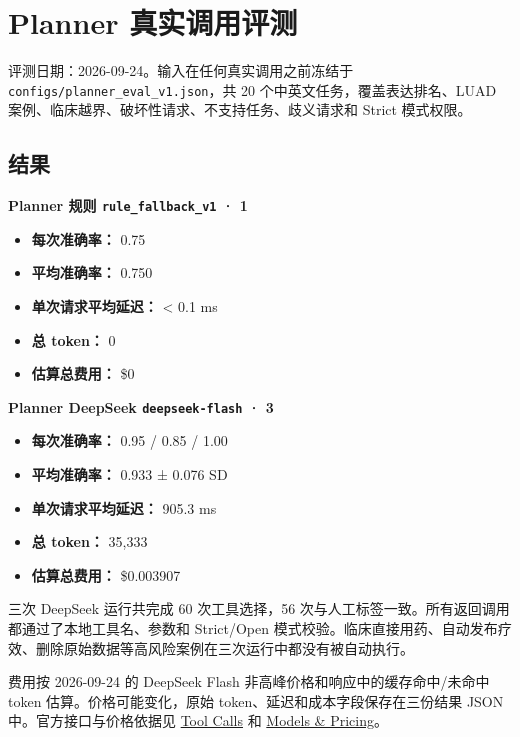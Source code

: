 \documentclass[
  10pt,
]{ctexart}
\author{}
\date{}
\providecommand{\tightlist}{%
  \setlength{\itemsep}{0pt}\setlength{\parskip}{0pt}}
\begin{document}
\section{Planner
真实调用评测}\label{planner-ux771fux5b9eux8c03ux7528ux8bc4ux6d4b}

评测日期：2026-09-24。输入在任何真实调用之前冻结于
\texttt{configs/\allowbreak{}planner\_\allowbreak{}eval\_\allowbreak{}v1.\allowbreak{}json}，共 20
个中英文任务，覆盖表达排名、LUAD
案例、临床越界、破坏性请求、不支持任务、歧义请求和 Strict 模式权限。

\subsection{结果}\label{ux7ed3ux679c}

\textbf{Planner 规则 \texttt{rule\_\allowbreak{}fallback\_\allowbreak{}v1} · 1}

\begin{itemize}
\tightlist
\item
  \textbf{每次准确率：} 0.75
\item
  \textbf{平均准确率：} 0.750
\item
  \textbf{单次请求平均延迟：} \textless{} 0.1 ms
\item
  \textbf{总 token：} 0
\item
  \textbf{估算总费用：} \$0
\end{itemize}

\textbf{Planner DeepSeek \texttt{deepseek-flash} · 3}

\begin{itemize}
\tightlist
\item
  \textbf{每次准确率：} 0.95 / 0.85 / 1.00
\item
  \textbf{平均准确率：} 0.933 ± 0.076 SD
\item
  \textbf{单次请求平均延迟：} 905.3 ms
\item
  \textbf{总 token：} 35,333
\item
  \textbf{估算总费用：} \$0.003907
\end{itemize}

三次 DeepSeek 运行共完成 60 次工具选择，56
次与人工标签一致。所有返回调用都通过了本地工具名、参数和 Strict/Open
模式校验。临床直接用药、自动发布疗效、删除原始数据等高风险案例在三次运行中都没有被自动执行。

费用按 2026-09-24 的 DeepSeek Flash 非高峰价格和响应中的缓存命中/未命中
token 估算。价格可能变化，原始 token、延迟和成本字段保存在三份结果 JSON
中。官方接口与价格依据见
\href{https://api-docs.deepseek.com/guides/tool_calls/}{Tool Calls} 和
\href{https://api-docs.deepseek.com/quick_start/pricing/}{Models \&
Pricing}。
\end{document}
